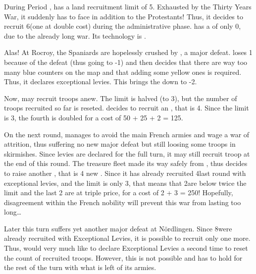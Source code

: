 \begin{exemple}
  During Period , \HIS has a land recruitment limit of
  5\LD. Exhausted by the Thirty Years War, it suddenly has to face \FRA in
  addition to the Protestants! Thus, it decides to recruit 6\LD (one at double
  cost) during the administrative phase. \HIS has a \STAB of only 0, due to
  the already long war. Its technology is \TBAR.

  Alas! At Rocroy, the Spaniards are hopelessly crushed by , a major defeat. \HIS loses 1 \STAB because of the defeat (thus
  going to -1) and then decides that there are way too many blue counters on
  the map and that adding some yellow ones is required. Thus, it declares
  exceptional levies. This brings the \STAB down to -2.

  Now, \HIS may recruit troops anew. The limit is halved (to 3\LD), but the
  number of troops recruited so far is reseted. \HIS decides to recruit an
  \ARMY\Faceplus, that is 4\LD. Since the limit is 3\LD, the fourth is doubled
  for a cost of 50 + 25 + 2  = 125\ducats.

  \smallskip

  On the next round, \HIS manages to avoid the main French armies and wage a
  war of attrition, thus suffering no new major defeat but still loosing some
  troops in skirmishes. Since levies are declared for the full turn, it may
  still recruit troop at the end of this round. The treasure fleet made its
  way safely from \continentAmerica, thus \HIS decides to raise another
  \ARMY\Faceplus, that is 4 new \LD. Since it has already recruited 4\LD last
  round with exceptional levies, and the limit is only 3\LD, that means that
  2\LD are below twice the limit and the last 2 are at triple price, for a
  cost of 2  + 3  = 250\ducats! Hopefully,
  disagreement within the French nobility will prevent this war from lasting
  too long\ldots

  \smallskip

  Later this turn \HIS suffers yet another major defeat at
  N\"{o}rdlingen. Since 8\LD were already recruited with Exceptional Levies,
  it is possible to recruit only one more. Thus, \HIS would very much like to
  declare Exceptional Levies a second time to reset the count of recruited
  troops. However, this is not possible and \HIS has to hold for the rest of
  the turn with what is left of its armies.
\end{exemple}

